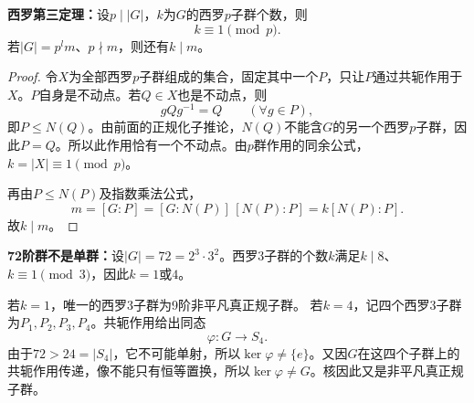 \begin{theorem}\label{p2:sylow-three}
\textbf{西罗第三定理：}设$p\mid|G|$，$k$为$G$的西罗$p$子群个数，则
\[
k\equiv1\pmod p.
\]
若$|G|=p^lm$、$p\nmid m$，则还有$k\mid m$。
\end{theorem}
\begin{proof}
令$X$为全部西罗$p$子群组成的集合，固定其中一个$P$，只让$P$通过共轭作用于$X$。$P$自身是不动点。若$Q\in X$也是不动点，则
\[
gQg^{-1}=Q\qquad(\forall g\in P),
\]
即$P\leq N(Q)$。由前面的正规化子推论，$N(Q)$不能含$G$的另一个西罗$p$子群，因此$P=Q$。所以此作用恰有一个不动点。由$p$群作用的同余公式，$k=|X|\equiv1\pmod p$。

再由$P\leq N(P)$及指数乘法公式，
\[
m=[G:P]=[G:N(P)]\,[N(P):P]=k[N(P):P].
\]
故$k\mid m$。
\end{proof}

\begin{example}
\textbf{72阶群不是单群：}设$|G|=72=2^3\cdot3^2$。西罗3子群的个数$k$满足$k\mid8$、$k\equiv1\pmod3$，因此$k=1$或$4$。

若$k=1$，唯一的西罗3子群为9阶非平凡真正规子群。
若$k=4$，记四个西罗3子群为$P_1,P_2,P_3,P_4$。共轭作用给出同态
\[
\varphi:G\longrightarrow S_4.
\]
由于$72>24=|S_4|$，它不可能单射，所以$\ker\varphi\ne\{e\}$。又因$G$在这四个子群上的共轭作用传递，像不能只有恒等置换，所以$\ker\varphi\ne G$。核因此又是非平凡真正规子群。
\end{example}
